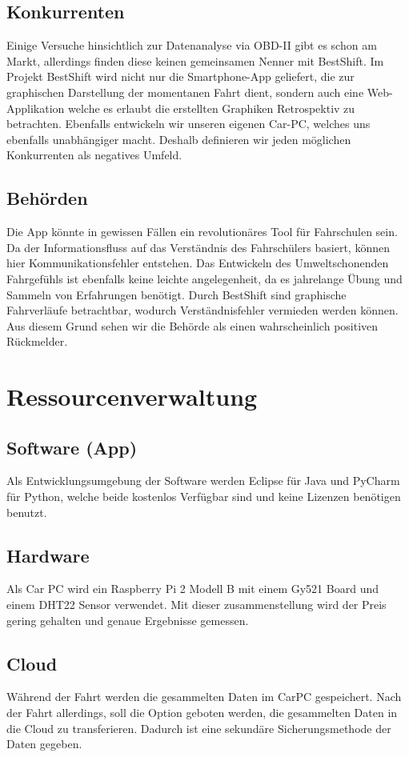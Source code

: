 \subsection{Konkurrenten}
Einige Versuche hinsichtlich zur Datenanalyse via OBD-II gibt es schon am Markt,
allerdings finden diese keinen gemeinsamen Nenner mit BestShift.
Im Projekt BestShift wird nicht nur die Smartphone-App geliefert, die zur graphischen Darstellung der momentanen Fahrt dient, sondern auch eine Web-Applikation welche es erlaubt die erstellten Graphiken Retrospektiv zu betrachten.
Ebenfalls entwickeln wir unseren eigenen Car-PC, welches uns ebenfalls unabhängiger macht.
Deshalb definieren wir jeden möglichen Konkurrenten als negatives Umfeld.


\subsection{Behörden}
Die App könnte in gewissen Fällen ein revolutionäres Tool für Fahrschulen sein.
Da der Informationsfluss auf das Verständnis des Fahrschülers basiert, 
können hier Kommunikationsfehler entstehen. Das Entwickeln des Umweltschonenden Fahrgefühls ist
ebenfalls keine leichte angelegenheit, da es jahrelange Übung und Sammeln von Erfahrungen benötigt. Durch BestShift sind graphische Fahrverläufe betrachtbar, wodurch Verständnisfehler vermieden werden können. Aus diesem Grund sehen wir die Behörde als einen wahrscheinlich positiven Rückmelder.


\section{Ressourcenverwaltung}

\subsection{Software (App)}
Als Entwicklungsumgebung der Software werden Eclipse für Java und PyCharm für Python,
welche beide kostenlos Verfügbar sind und keine Lizenzen benötigen benutzt.

\subsection{Hardware}
Als Car PC wird ein Raspberry Pi 2 Modell B mit einem Gy521 Board und einem DHT22 Sensor verwendet. Mit dieser zusammenstellung wird der Preis gering gehalten und genaue Ergebnisse gemessen.

\subsection{Cloud}
Während der Fahrt werden die gesammelten Daten im CarPC gespeichert.
Nach der Fahrt allerdings, soll die Option geboten werden, die gesammelten Daten
in die Cloud zu transferieren. Dadurch ist eine sekundäre Sicherungsmethode der Daten
gegeben.